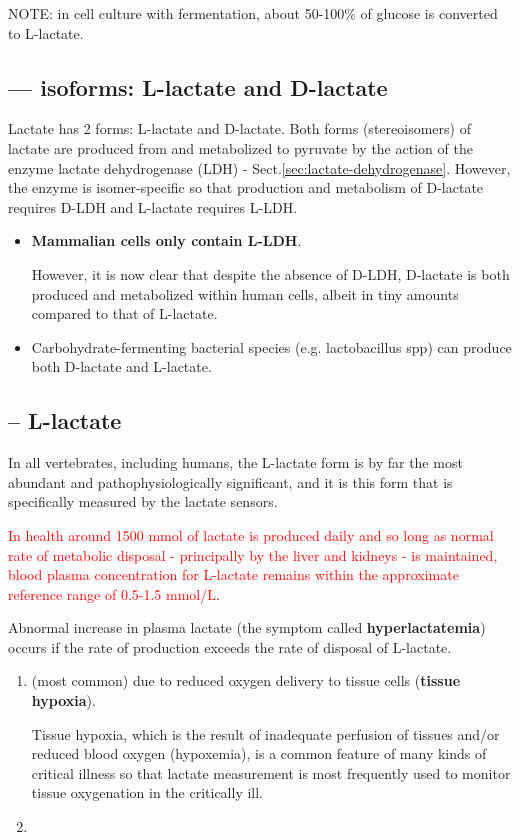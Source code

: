 NOTE: in cell culture with fermentation, about 50-100\% of glucose is converted
to L-lactate.




\subsection{--- isoforms: L-lactate and D-lactate}

Lactate has 2 forms: L-lactate and D-lactate. Both forms (stereoisomers) of
lactate are produced from and metabolized to pyruvate by the action of the
enzyme lactate dehydrogenase (LDH) - Sect.\ref{sec:lactate-dehydrogenase}.
However, the enzyme is isomer-specific so that production and metabolism of
D-lactate requires D-LDH and L-lactate requires L-LDH.

\begin{itemize}

  \item {\bf Mammalian cells only contain L-LDH}.

However, it is now clear that despite the absence of D-LDH, D-lactate is both
produced and metabolized within human cells, albeit in tiny amounts compared to
that of L-lactate.

  
  \item  Carbohydrate-fermenting bacterial species (e.g. lactobacillus spp) can
  produce both D-lactate and L-lactate.
\end{itemize}

\subsection{-- L-lactate}
\label{sec:L-lactate}

In all vertebrates, including humans, the L-lactate form is by far the most
abundant and pathophysiologically significant, and it is this form that is
specifically measured by the lactate sensors.

\textcolor{red}{In health around 1500 mmol of lactate is produced daily and so
long as normal rate of metabolic disposal - principally by the liver and kidneys - is
maintained, blood plasma concentration for L-lactate remains within the
approximate reference range of 0.5-1.5 mmol/L}.

Abnormal increase in plasma lactate (the symptom called {\bf hyperlactatemia})
occurs if the rate of production exceeds the rate of disposal of L-lactate. 
\begin{enumerate}
  \item  (most common) due to reduced oxygen delivery to tissue cells
  ({\bf tissue hypoxia}).

 Tissue hypoxia, which is the result of inadequate perfusion of tissues and/or
reduced blood oxygen (hypoxemia), is a common feature of many kinds of
critical illness so that lactate measurement is most frequently used to
monitor tissue oxygenation in the critically ill.
  
  \item 
\end{enumerate}


